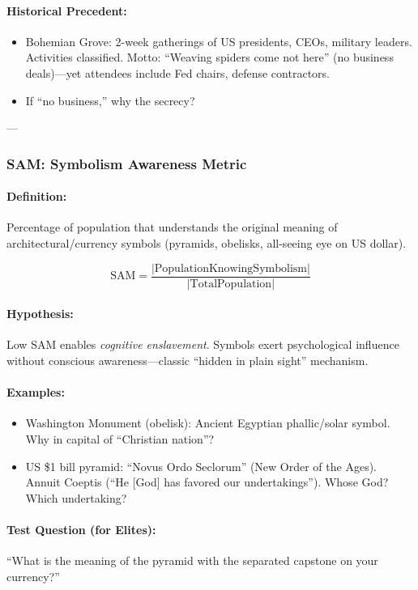 \documentclass[11pt,a4paper]{article}
\theoremstyle{definition}
\theoremstyle{remark}
\begin{document}
\paragraph{Historical Precedent:}
\begin{itemize}
\item Bohemian Grove: 2-week gatherings of US presidents, CEOs, military leaders. Activities classified. Motto: ``Weaving spiders come not here'' (no business deals)—yet attendees include Fed chairs, defense contractors.
\item If ``no business,'' why the secrecy?
\end{itemize}

---

\subsubsection{SAM: Symbolism Awareness Metric}

\paragraph{Definition:}
Percentage of population that understands the original meaning of architectural/currency symbols (pyramids, obelisks, all-seeing eye on US dollar).

\[
\text{SAM} = \frac{|\text{PopulationKnowingSymbolism}|}{|\text{TotalPopulation}|}
\]

\paragraph{Hypothesis:}
Low SAM enables \textit{cognitive enslavement}. Symbols exert psychological influence without conscious awareness—classic ``hidden in plain sight'' mechanism.

\paragraph{Examples:}
\begin{itemize}
\item Washington Monument (obelisk): Ancient Egyptian phallic/solar symbol. Why in capital of ``Christian nation''?
\item US \$1 bill pyramid: ``Novus Ordo Seclorum'' (New Order of the Ages). Annuit Coeptis (``He [God] has favored our undertakings''). Whose God? Which undertaking?
\end{itemize}

\paragraph{Test Question (for Elites):}
``What is the meaning of the pyramid with the separated capstone on your currency?''
\end{document}

